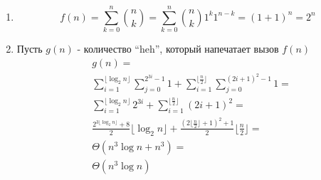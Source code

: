 \documentclass{article}
\begin{document}
\begin{enumerate}
    \item
          \[
              f(n) = \sum_{k=0}^{n}{n \choose k} = \sum_{k=0}^{n}{n \choose k}1^{k}1^{n-k} = (1 + 1)^n = 2^n
          \]
    \item Пусть $g(n)$ - количество ``heh'', который напечатает вызов $f(n)$
          \begin{align*}
               & g(n) =                                                                                                                                                      \\
               & \sum_{i=1}^{\lfloor \log_2{n} \rfloor}{\sum_{j=0}^{2^{3i} - 1}{1}} + \sum_{i=1}^{\lfloor \frac{n}{2} \rfloor}{\sum_{j=0}^{(2i + 1)^2 - 1}{1}} =             \\
               & \sum_{i=1}^{\lfloor \log_2{n} \rfloor}{2^{3i}} + \sum_{i=1}^{\lfloor \frac{n}{2} \rfloor}{(2i + 1)^2} =                                                     \\
               & \frac{2^{3\lfloor \log_2{n} \rfloor} + 8}{2} \lfloor \log_2{n} \rfloor + \frac{(2\lfloor \frac{n}{2} \rfloor + 1) ^ 2 + 1}{2} \lfloor \frac{n}{2} \rfloor = \\
               & \Theta(n^3\log{n} + n^3) =                                                                                                                                  \\
               & \Theta(n^3\log{n})
          \end{align*}
\end{enumerate}
\end{document}
